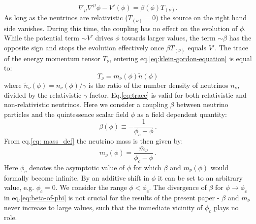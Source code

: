 \begin{equation}
\nabla_{\mu}\nabla^{\mu}\phi-V'(\phi)=\beta(\phi)T_{(\nu)}.\label{eq:klein-gordon-equation}
\end{equation}
As long as the neutrinos are relativistic ($T_{(\nu)}=0)$ the source
on the right hand side vanishes. During this time, the coupling has
no effect on the evolution of $\phi$. While the potential term $\sim V'$
drives $\phi$ towards larger values, the term $\sim\beta$ has the
opposite sign and stops the evolution effectively once $\beta T_{(\nu)}$
equals $V'$. The trace of the energy momentum tensor $T_{\nu}$,
entering eq.\ref{eq:klein-gordon-equation} is equal to: 
\begin{equation}
T_{\nu}=m_{\nu}(\phi)\tilde{n}(\phi)\label{eq:trace}
\end{equation}
where $\tilde{n}_{\nu}(\phi)=n_{\nu}(\phi)/\gamma$ is the ratio of
the number density of neutrinos $n_{\nu}$, divided by the relativistic
$\gamma$ factor. Eq.\ref{eq:trace} is valid for both relativistic
and non-relativistic neutrinos. Here we consider a coupling $\beta$
between neutrino particles and the quintessence scalar field $\phi$
as a field dependent quantity: 
\begin{equation}
\beta(\phi)\equiv-\frac{1}{\phi_{c}-\phi}\,.\label{eq:beta-of-phi}
\end{equation}
From eq.\ref{eq: mass_def} the neutrino mass is then given
by: 
\begin{equation}
m_{\nu}(\phi)=\frac{\bar{m}_{\nu}}{\phi_{c}-\phi}\,.\label{eq:mnu-of-phi}
\end{equation}
Here $\phi_{c}$ denotes the asymptotic value of $\phi$ for which
$\beta$ and $m_{\nu}(\phi)$ would formally become infinite. By an
additive shift in $\phi$ it can be set to an arbitrary value, e.g.
$\phi_{c}=0$. We consider the range $\phi<\phi_{c}$. The divergence
of $\beta$ for $\phi\rightarrow\phi_{c}$ in eq.\ref{eq:beta-of-phi}
is not crucial for the results of the present paper - $\beta$ and
$m_{\nu}$ never increase to large values, such that the immediate
vicinity of $\phi_{c}$ plays no role.

